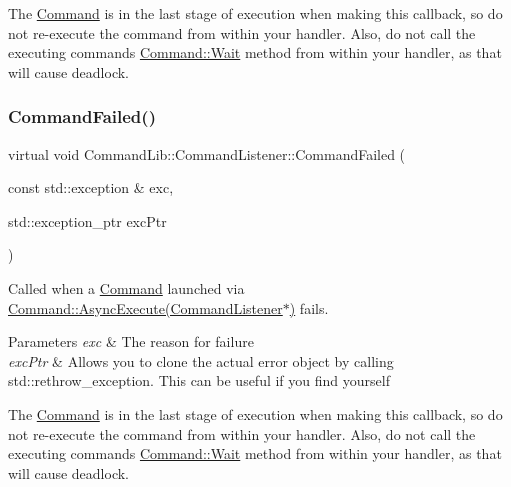 The \mbox{\hyperlink{class_command_lib_1_1_command}{Command}} is in the last stage of execution when making this callback, so do not re-\/execute the command from within your handler. Also, do not call the executing command\textquotesingle{}s \mbox{\hyperlink{class_command_lib_1_1_command_ac4d49fbf9bbcc543fb57e4b04edf1ddb}{Command\+::\+Wait}} method from within your handler, as that will cause deadlock. \mbox{\label{class_command_lib_1_1_command_listener_ae53f9a18ffd79b79754dfdcfb84b138e}} 
\subsubsection{\texorpdfstring{Command\+Failed()}{CommandFailed()}}
{\footnotesize\ttfamily virtual void Command\+Lib\+::\+Command\+Listener\+::\+Command\+Failed (\begin{DoxyParamCaption}\item[{const std\+::exception \&}]{exc,  }\item[{std\+::exception\+\_\+ptr}]{exc\+Ptr }\end{DoxyParamCaption})\hspace{0.3cm}{\ttfamily [pure virtual]}}

Called when a \mbox{\hyperlink{class_command_lib_1_1_command}{Command}} launched via \mbox{\hyperlink{class_command_lib_1_1_command_a44bad231a0f0a6de3d5405382d95f800}{Command\+::\+Async\+Execute(\+Command\+Listener$\ast$)}} fails. 


\begin{DoxyParams}{Parameters}
{\em exc} & The reason for failure\\
\hline
{\em exc\+Ptr} & Allows you to clone the actual error object by calling std\+::rethrow\+\_\+exception. This can be useful if you find yourself \\
\hline
\end{DoxyParams}


The \mbox{\hyperlink{class_command_lib_1_1_command}{Command}} is in the last stage of execution when making this callback, so do not re-\/execute the command from within your handler. Also, do not call the executing command\textquotesingle{}s \mbox{\hyperlink{class_command_lib_1_1_command_ac4d49fbf9bbcc543fb57e4b04edf1ddb}{Command\+::\+Wait}} method from within your handler, as that will cause deadlock. \mbox{\label{class_command_lib_1_1_command_listener_a42f73f4eb4582aa82a0bd1d57151ef73}} 
